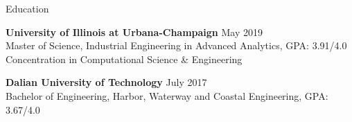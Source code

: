 \documentclass{resume} %
\begin{document}





\begin{rSection}{Education}



{\bf University of Illinois at Urbana-Champaign} \hfill {May 2019}
\\ 
Master of Science, Industrial Engineering in Advanced Analytics, GPA: 3.91/4.0
\\
Concentration in Computational Science \& Engineering

{\bf Dalian University of Technology} \hfill {July 2017}
\\ 
Bachelor of Engineering, Harbor, Waterway and Coastal Engineering, GPA: 3.67/4.0

\end{rSection}
\end{document}
